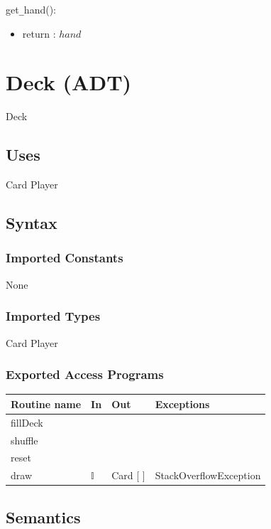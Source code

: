 \documentclass[12pt, titlepage]{article}
\begin{document}
\noindent get\verb|_|hand():
\begin{itemize}
\item return : $hand$ 
\end{itemize}

\section* {Deck (ADT)}

Deck

\subsection* {Uses}

Card
Player

\subsection* {Syntax}

\subsubsection* {Imported Constants}

None

\subsubsection* {Imported Types}

Card
Player

\subsubsection* {Exported Access Programs}

\begin{tabular}{| l | l | l | p{5cm} |}
\hline
\textbf{Routine name} & \textbf{In} & \textbf{Out} & \textbf{Exceptions}\\
\hline
fillDeck & & &\\
\hline
shuffle & & &\\
\hline 
reset & & &\\
\hline 
draw & $\mathbb{I}$& Card [ ] & StackOverflowException\\
\hline 
\end{tabular}

\subsection* {Semantics}
\end{document}
